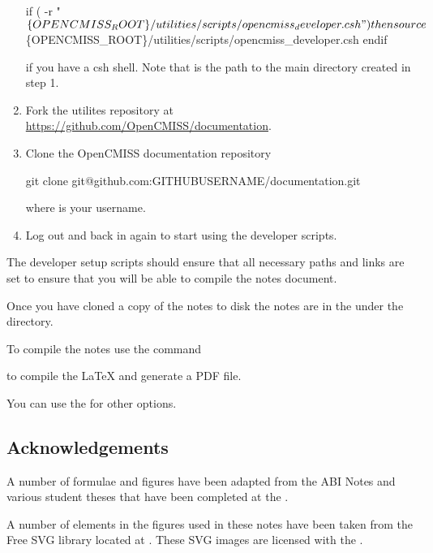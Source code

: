 \begin{enumerate}
\begin{code}
    if ( -r "$\{OPENCMISS_ROOT\}/utilities/scripts/opencmiss_developer.csh" ) then
      source $\{OPENCMISS_ROOT\}/utilities/scripts/opencmiss_developer.csh
    endif
  \end{code} if you have a csh shell. Note that
   is the path to
  the main directory created in step 1.
\item Fork the \OpenCMISS \GitHub utilites repository at \url{https://github.com/OpenCMISS/documentation}.
\item Clone the OpenCMISS documentation repository \ie
  \begin{code}
    git clone git@github.com:GITHUBUSERNAME/documentation.git
  \end{code} where  is your \GitHub username.
\item Log out and back in again to start using the developer scripts.
\end{enumerate}

The developer setup scripts should ensure that all necessary paths and
links are set to ensure that you will be able to compile the
\OpenCMISS notes document.

Once you have cloned a copy of the notes to disk the notes are in the
 under the 
directory.

To compile the notes use the  command \ie
{}
to compile the \LaTeX\xspace and generate a PDF file.

You can use the  for other options.

\subsection{Acknowledgements}
\label{subsec:IntroAcknowledgements}

A number of formulae and figures have been adapted from the ABI Notes
and various student theses that have been completed at the
.

A number of elements in the figures used in these notes have been
taken from the Free {SVG} library located at
. These {SVG} images are licensed with
the .
